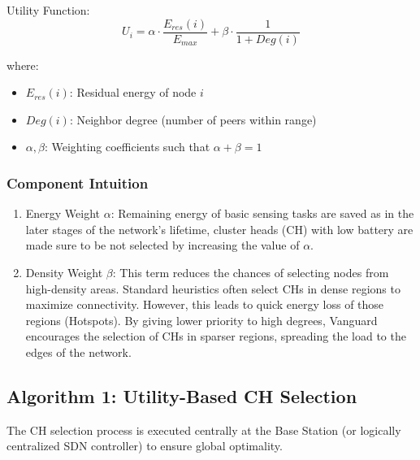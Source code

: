 \documentclass[conference]{IEEEtran}
\begin{document}
Utility Function:
\begin{equation}
U_i = \alpha \cdot \frac{E_{res}(i)}{E_{max}} + \beta \cdot \frac{1}{1 + Deg(i)}
\end{equation}

where:
\begin{itemize}
    \item $E_{res}(i)$: Residual energy of node $i$
    \item $Deg(i)$: Neighbor degree (number of peers within range)
    \item $\alpha, \beta$: Weighting coefficients such that $\alpha + \beta = 1$
\end{itemize}

\subsubsection{Component Intuition}
\begin{enumerate}
    \item Energy Weight $\alpha$: Remaining energy of basic sensing tasks are saved as in the later stages of the network's lifetime, cluster heads (CH) with low battery are made sure to be not selected by increasing the value of $\alpha$.
    \item Density Weight $\beta$: This term reduces the chances of selecting nodes from high-density areas. Standard heuristics often select CHs in dense regions to maximize connectivity. However, this leads to quick energy loss of those regions (Hotspots). By giving lower priority to high degrees, Vanguard encourages the selection of CHs in sparser regions, spreading the load to the edges of the network.
\end{enumerate}

\subsection{Algorithm 1: Utility-Based CH Selection}
The CH selection process is executed centrally at the Base Station (or logically centralized SDN controller) to ensure global optimality.
\end{document}
